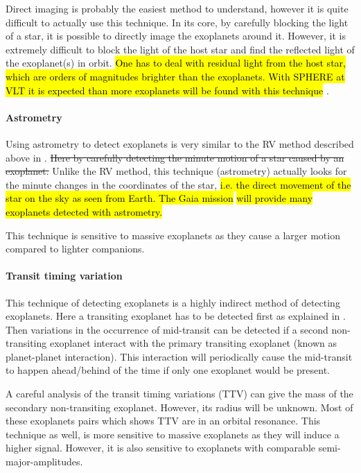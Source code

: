 Direct imaging is probably the easiest method to understand, however it is quite difficult to
actually use this technique. In its core, by carefully blocking the light of a star, it is possible
to directly image the exoplanets around it. However, it is extremely difficult to block the light of
the host star and find the reflected light of the exoplanet(s) in orbit. \hl{One has to deal with
residual light from the host star, which are orders of magnitudes brighter than the exoplanets. With
SPHERE at VLT it is expected than more exoplanets will be found with this technique}
\citep{Beuzit2008}.


\paragraph{Astrometry}

Using astrometry to detect exoplanets is very similar to the RV method described above in
. \st{Here by carefully detecting the minute motion of a star caused by an
exoplanet.} Unlike the RV method, this technique (astrometry) actually looks for the minute changes
in the coordinates of the star, \hl{i.e. the direct movement of the star on the sky as seen from
Earth. The Gaia mission} \citep{GAIA} \hl{will provide many exoplanets detected with astrometry.}

This technique is sensitive to massive exoplanets as they cause a larger motion compared to lighter
companions.


\paragraph{Transit timing variation}

This technique of detecting exoplanets is a highly indirect method of detecting exoplanets. Here a
transiting exoplanet has to be detected first as explained in . Then
variations in the occurrence of mid-transit can be detected if a second non-transiting exoplanet
interact with the primary transiting exoplanet (known as planet-planet interaction). This
interaction will periodically cause the mid-transit to happen ahead/behind of the time if only one
exoplanet would be present.

A careful analysis of the transit timing variations (TTV) can give the mass of the secondary
non-transiting exoplanet. However, its radius will be unknown. Most of these exoplanets pairs which
shows TTV are in an orbital resonance. This technique as well, is more sensitive to massive
exoplanets as they will induce a higher signal. However, it is also sensitive to exoplanets with
comparable semi-major-amplitudes.


